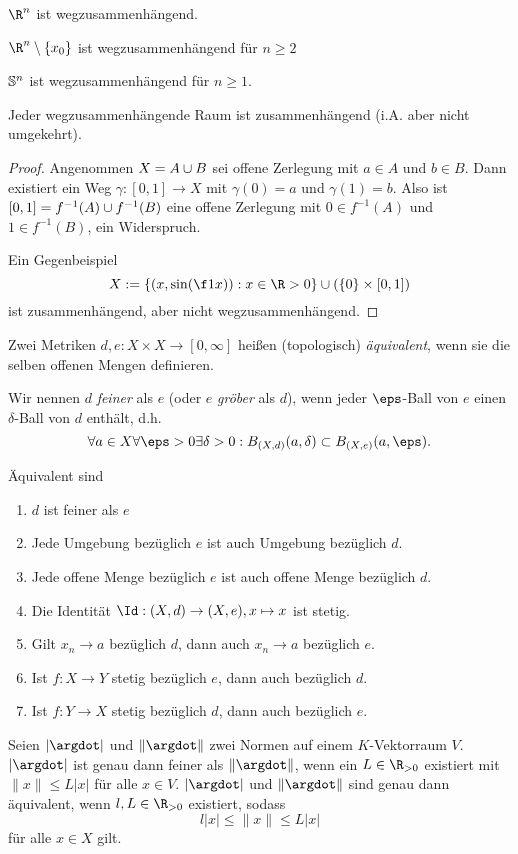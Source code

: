 \begin{ex}
	$\R^n$ ist wegzusammenhängend.

	$\R^n \setminus \{x_0\}$ ist wegzusammenhängend für $n \ge 2$

	$\S^n$ ist wegzusammenhängend für $n \ge 1$.
\end{ex}

\begin{st}
	Jeder wegzusammenhängende Raum ist zusammenhängend (i.A. aber nicht umgekehrt).
	\begin{proof}
		Angenommen $X = A \dunion B$ sei offene Zerlegung mit $a \in A$ und $b \in B$.
		Dann existiert ein Weg $\gamma: [0,1] \to X$ mit $\gamma(0) = a$ und $\gamma(1) = b$.
		Also ist $[0,1] = f^{-1}(A) \dunion f^{-1}(B)$ eine offene Zerlegung mit $0 \in f^{-1}(A)$ und $1 \in f^{-1}(B)$, ein Widerspruch.

		Ein Gegenbeispiel
		\[
			X := \{ (x,\sin(\f 1x)) : x \in \R>0 \} \cup ( \{0\} \times [0,1] )
		\]
		ist zusammenhängend, aber nicht wegzusammenhängend.
	\end{proof}
\end{st}

\begin{df}
	Zwei Metriken $d,e : X \times X \to [0, \infty]$ heißen (topologisch) \emph{äquivalent}, wenn sie die selben offenen Mengen definieren.

	Wir nennen $d$ \emph{feiner} als $e$ (oder $e$ \emph{gröber} als $d$), wenn jeder $\eps$-Ball von $e$ einen $\delta$-Ball von $d$ enthält, d.h.
	\[
		\forall a \in X \forall \eps > 0 \exists \delta > 0 : B_{(X,d)}(a, \delta) \subset B_{(X,e)}(a, \eps).
	\]
\end{df}

\begin{prop}
	Äquivalent sind
	\begin{enumerate}[(1)]
		\item
			$d$ ist feiner als $e$
		\item
			Jede Umgebung bezüglich $e$ ist auch Umgebung bezüglich $d$.
		\item
			Jede offene Menge bezüglich $e$ ist auch offene Menge bezüglich $d$.
		\item
			Die Identität $\Id: (X,d) \to (X,e), x \mapsto x$ ist stetig.
		\item
			Gilt $x_n \to a$ bezüglich $d$, dann auch $x_n \to a$ bezüglich $e$.
		\item
			Ist $f: X \to Y$ stetig bezüglich $e$, dann auch bezüglich $d$.
		\item
			Ist $f: Y \to X$ stetig bezüglich $d$, dann auch bezüglich $e$.
	\end{enumerate}
	Seien $|\argdot|$ und $\|\argdot\|$ zwei Normen auf einem $K$-Vektorraum $V$.
	$|\argdot|$ ist genau dann feiner als $\|\argdot\|$, wenn ein $L \in \R_{>0}$ existiert mit $\|x\| \le L |x|$ für alle $x \in V$.
	$|\argdot|$ und $\|\argdot\|$ sind genau dann äquivalent, wenn $l,L \in \R_{>0}$ existiert, sodass
	\[
		l|x| \le \|x\| \le L|x|
	\]
	für alle $x \in X$ gilt.
\end{prop}

